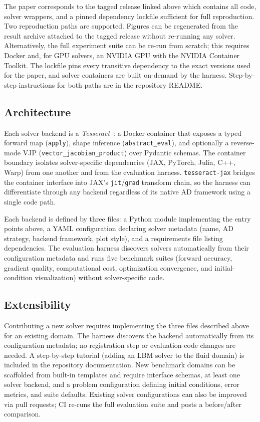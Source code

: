 \documentclass{article}
\begin{document}
The paper corresponds to the tagged release linked above which contains all code,
solver wrappers, and a pinned dependency lockfile sufficient for full
reproduction. Two reproduction paths are supported. Figures can be
regenerated from the result archive attached to the tagged release without
re-running any solver. Alternatively, the full experiment suite can be
re-run from scratch; this requires Docker and, for GPU solvers, an NVIDIA
GPU with the NVIDIA Container Toolkit. The lockfile pins every transitive
dependency to the exact versions used for the paper, and solver containers
are built on-demand by the harness. Step-by-step instructions for both
paths are in the repository README.

\subsection{Architecture}

Each solver backend is a \emph{Tesseract}~\cite{haefner2025tesseract}: a
Docker container that exposes a typed forward map (\texttt{apply}), shape
inference (\texttt{abstract\_eval}), and optionally a reverse-mode VJP
(\texttt{vector\_jacobian\_product}) over Pydantic schemas. The container
boundary isolates solver-specific dependencies (JAX, PyTorch, Julia, C++,
Warp) from one another and from the evaluation harness.
\texttt{tesseract-jax} bridges the container interface into JAX's
\texttt{jit}/\texttt{grad} transform chain, so the harness can
differentiate through any backend regardless of its native AD framework
using a single code path.

Each backend is defined by three files: a Python module implementing the
entry points above, a YAML configuration declaring solver metadata (name,
AD strategy, backend framework, plot style), and a requirements file listing
dependencies. The evaluation harness discovers solvers automatically from
their configuration metadata and runs five benchmark suites (forward
accuracy, gradient quality, computational cost, optimization convergence,
and initial-condition visualization) without solver-specific code.

\subsection{Extensibility}

Contributing a new solver requires implementing the three files described
above for an existing domain. The harness discovers the backend
automatically from its configuration metadata; no registration step or
evaluation-code changes are needed. A step-by-step tutorial (adding an LBM
solver to the fluid domain) is included in the repository documentation.
New benchmark domains can be scaffolded from built-in templates and require
interface schemas, at least one solver backend, and a problem configuration
defining initial conditions, error metrics, and suite defaults. Existing
solver configurations can also be improved via pull requests; CI re-runs
the full evaluation suite and posts a before/after comparison.
\end{document}
